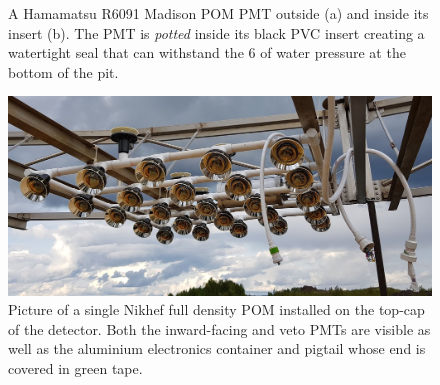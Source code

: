 \begin{figure} %
    \centering
    \quad
    \caption[Madison POM PMT assembly.]
    {A Hamamatsu R6091 Madison POM PMT outside (a) and inside its insert (b). The PMT is
        \emph{potted} inside its black PVC insert creating a watertight seal that can withstand the
        \unit{6}{} of water pressure at the bottom of the pit.}
    \label{fig:madison_pmt_assembly}
\end{figure}

\begin{figure} %
    \includegraphics[width=\textwidth]{diagrams/4-chips/single_plane.jpg}
    \caption[Picture of a Nikhef POM.]
    {Picture of a single Nikhef full density POM installed on the top-cap of the \chipsfive
        detector. Both the inward-facing and veto PMTs are visible as well as the aluminium
        electronics container and pigtail whose end is covered in green tape.}
    \label{fig:single_plane}
\end{figure}

